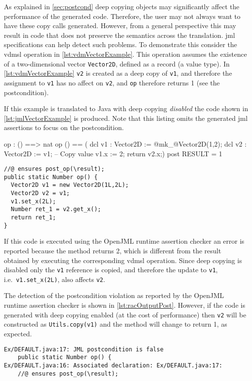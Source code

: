 As explained in \autoref{sec:postcond} deep copying objects may
significantly affect the performance of the generated code. Therefore,
the user may not always want to have these copy calls
generated. However, from a general perspective this may result in code
that does not preserve the semantics across the translation. \ac{jml}
specifications can help detect such problems. To demonstrate this
consider the \ac{vdmsl} operation in
\autoref{lst:vdmVectorExample}. This operation assumes the existence
of a two-dimensional vector \texttt{Vector2D}, defined as a record (a
value type). In \autoref{lst:vdmVectorExample} \texttt{v2} is created
as a deep copy of \texttt{v1}, and therefore the assignment to
\texttt{v1} has no affect on \texttt{v2}, and \texttt{op} therefore
returns 1 (see the postcondition).

If this example is translated to Java with deep copying
\emph{disabled} the code shown in \autoref{lst:jmlVectorExample} is
produced. Note that this listing omits the generated \ac{jml}
assertions to focus on the postcondition.

\begin{vdmsl}[style=customVdm,caption={Use of value types in
\ac{vdm}.},label={lst:vdmVectorExample}]
op : () ==> nat
op () == (
dcl v1 : Vector2D := @mk_@Vector2D(1,2);
dcl v2 : Vector2D := v1; -- Copy value
v1.x := 2;
return v2.x;)
post RESULT = 1
\end{vdmsl}

\begin{lstlisting}[style=customJml,caption={Generated Java code
without copy calls.},label={lst:jmlVectorExample}]
//@ ensures post_op(\result);
public static Number op() {
  Vector2D v1 = new Vector2D(1L,2L);
  Vector2D v2 = v1;
  v1.set_x(2L);
  Number ret_1 = v2.get_x();
  return ret_1;
}
\end{lstlisting}

If this code is executed using the OpenJML runtime assertion checker
an error is reported because the method returns 2, which is different
from the result obtained by executing the corresponding \ac{vdmsl}
operation. Since deep copying is disabled only the \texttt{v1}
reference is copied, and therefore the update to \texttt{v1}, i.e.\
\texttt{v1.set\_x(2L)}, also affects \texttt{v2}.

The detection of the postcondition violation as reported by the
OpenJML runtime assertion checker is shown in
\autoref{lst:racOutputPost}. However, if the code is generated with
deep copying enabled (at the cost of performance) then \texttt{v2}
will be constructed as \texttt{Utils.copy(v1)} and the method will
change to return 1, as expected.

\begin{lstlisting}[style=racOutput,caption={Detection of a
postcondition violation.},label={lst:racOutputPost}]
Ex/DEFAULT.java:17: JML postcondition is false
    public static Number op() {
Ex/DEFAULT.java:16: Associated declaration: Ex/DEFAULT.java:17: 
    //@ ensures post_op(\result);
\end{lstlisting}



